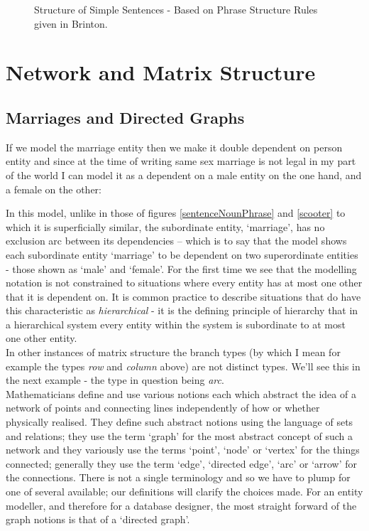 \begin{sidewaysfigure}

\caption{Structure of Simple Sentences - Based on Phrase Structure Rules given in Brinton.}
\label{brintonSimpleSentenceStructure}
\end{sidewaysfigure}

\section{Network and Matrix Structure}
\subsection {Marriages and Directed Graphs}
\noindent If we model the marriage entity then we make it double dependent on person entity and since at the time of writing same sex marriage is not legal in my part of the world I can model it as a dependent on a male entity on the one hand, and a female on the other:


\noindent In this model, unlike in those of figures \ref{sentenceNounPhrase} and \ref{scooter} 
to which it is superficially similar, the subordinate 
entity, `marriage', has no exclusion arc between its dependencies -- which is to say that the model shows each subordinate entity `marriage' to be dependent on two superordinate entities -   those shown as `male' and `female'. For the first time we see that the modelling notation is not constrained to situations where every entity has at most one other that it is dependent on. It is common practice to describe situations that do have this characteristic as \textit{hierarchical} - it is the defining principle of hierarchy that in a hierarchical system every entity within the system is subordinate to at most one other entity. \\

\noindent In other instances of matrix structure the branch types (by which I mean for example the types \textit{row} and \textit{column} above) are not distinct types. We'll see this in the next example - the type in question being \textit{arc}.  \\

\noindent Mathematicians define and use various notions each which abstract the idea of a network of points and connecting lines independently of how or whether physically realised. 
They define such abstract notions using the language of sets and relations;
they use the term `graph' for the most abstract concept of such a network and they variously use the terms `point', `node' or `vertex' for the things connected; generally they use the term `edge', `directed edge', `arc' or `arrow' for the connections. There is not a single terminology and so we have to plump for one of several available; our definitions will clarify the choices made. 
For an entity modeller, and therefore for a database designer, the most straight forward of the graph notions is that of a `directed graph'. \\

